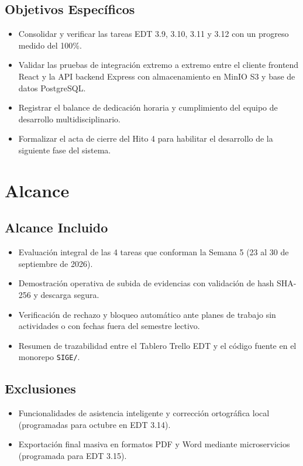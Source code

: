 \documentclass[12pt,a4paper]{article}
\begin{document}
\subsection{Objetivos Específicos}
\begin{itemize}[leftmargin=1.5em, itemsep=1.5pt]
    \item Consolidar y verificar las tareas EDT 3.9, 3.10, 3.11 y 3.12 con un progreso medido del 100\%.
    \item Validar las pruebas de integración extremo a extremo entre el cliente frontend React y la API backend Express con almacenamiento en MinIO S3 y base de datos PostgreSQL.
    \item Registrar el balance de dedicación horaria y cumplimiento del equipo de desarrollo multidisciplinario.
    \item Formalizar el acta de cierre del Hito 4 para habilitar el desarrollo de la siguiente fase del sistema.
\end{itemize}

\section{Alcance}

\subsection{Alcance Incluido}
\begin{itemize}[leftmargin=1.5em, itemsep=1.5pt]
    \item Evaluación integral de las 4 tareas que conforman la Semana 5 (23 al 30 de septiembre de 2026).
    \item Demostración operativa de subida de evidencias con validación de hash SHA-256 y descarga segura.
    \item Verificación de rechazo y bloqueo automático ante planes de trabajo sin actividades o con fechas fuera del semestre lectivo.
    \item Resumen de trazabilidad entre el Tablero Trello EDT y el código fuente en el monorepo \texttt{SIGE/}.
\end{itemize}

\subsection{Exclusiones}
\begin{itemize}[leftmargin=1.5em, itemsep=1.5pt]
    \item Funcionalidades de asistencia inteligente y corrección ortográfica local (programadas para octubre en EDT 3.14).
    \item Exportación final masiva en formatos PDF y Word mediante microservicios (programada para EDT 3.15).
\end{itemize}
\end{document}
